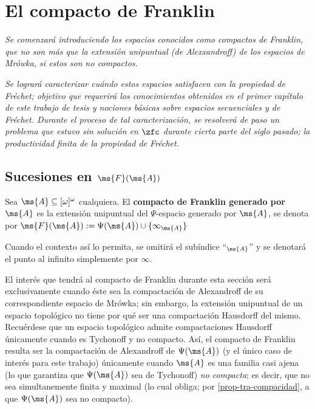 \chapter{El compacto de Franklin}
	\emph{\small Se comenzará introduciendo los espacios conocidos como \textit{compactos de Franklin}, que no son más que la extensión unipuntual (de Alexxandroff) de los espacios de Mrówka, si estos son no compactos.}

	\emph{\small Se logrará caracterizar cuándo estos espacios satisfacen con la propiedad de Fréchet; objetivo que requerirá los conocimientos obtenidos en el primer capítulo de este trabajo de tesis y nociones básicas sobre espacios secuenciales y de Fréchet. Durante el proceso de tal caracterización, se resolverá de paso un problema que estuvo sin solución en $\zfc$ durante cierta parte del siglo pasado; la productividad finita de la propiedad de Fréchet.}

	\section{\texorpdfstring{Sucesiones en $\ms{F}(\ms{A})$}{Sucesiones en F(A)}}
	\label{Subsec-sucesiones-Franklin}
	
	\begin{definicion}
		Sea $\ms{A}\subseteq [\omega]^\omega$ cualquiera. El \textbf{compacto de Franklin generado por $\ms{A}$} es la extensión unipuntual del $\Psi$-espacio generado por $\ms{A}$, se denota por $ \ms{F}(\ms{A}):=\Psi(\ms{A}) \cup \{\infty_\ms{A} \} $
		
		Cuando el contexto así lo permita, se omitirá el subíndice ``$_\ms{A}$'' y se denotará el punto al infinito simplemente por $\infty$.
	\end{definicion}
	
	El interés que tendrá al compacto de Franklin durante esta sección será exclusivamente cuando éste sea la compactación de Alexandroff de su correspondiente espacio de Mrówka; sin embargo, la extensión unipuntual de un espacio topológico no tiene por qué ser una compactación Hausdorff del mismo. Recuérdese que un espacio topológico admite compactaciones Hausdorff únicamente cuando es Tychonoff y no compacto. Así, el compacto de Franklin resulta ser la compactación de Alexandroff de $\Psi(\ms{A})$ (y el único caso de interés para este trabajo) únicamente cuando $\ms{A}$ es una familia casi ajena (lo que garantiza que $\Psi(\ms{A})$ sea de Tychonoff) \textit{no compacta}; es decir, que no sea simultanemente finita y maximal (lo cual obliga; por \ref{prop-tra-compacidad}, a que $\Psi(\ms{A})$ sea no compacto).

